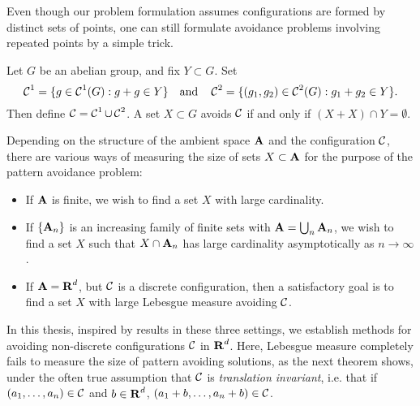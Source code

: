 
Even though our problem formulation assumes configurations are formed by distinct sets of points, one can still formulate avoidance problems involving repeated points by a simple trick.

\begin{example}
	Let $G$ be an abelian group, and fix $Y \subset G$. Set
	\[ \operatorname{\mathcal{C}}^1 = \{ g \in \operatorname{\mathcal{C}}^1(G): g + g \in Y \} \quad \text{and} \quad \operatorname{\mathcal{C}}^2 = \{ (g_1,g_2) \in \operatorname{\mathcal{C}}^2(G): g_1 + g_2 \in Y \}. \]
	Then define $\operatorname{\mathcal{C}} = \operatorname{\mathcal{C}}^1 \cup \operatorname{\mathcal{C}}^2$. A set $X \subset G$ avoids $\operatorname{\mathcal{C}}$ if and only if $(X + X) \cap Y = \emptyset$.
\end{example}

Depending on the structure of the ambient space $\operatorname{\mathbf{A}}$ and the configuration $\operatorname{\mathcal{C}}$, there are various ways of measuring the size of sets $X \subset \operatorname{\mathbf{A}}$ for the purpose of the pattern avoidance problem:
%
\begin{itemize}
	\item If $\operatorname{\mathbf{A}}$ is finite, we wish to find a set $X$ with large cardinality.
	\item If $\{ \operatorname{\mathbf{A}}_n \}$ is an increasing family of finite sets with $\operatorname{\mathbf{A}} = \bigcup_n \operatorname{\mathbf{A}}_n$, we wish to find a set $X$ such that $X \cap \operatorname{\mathbf{A}}_n$ has large cardinality asymptotically as $n \to \infty$.
	\item If $\operatorname{\mathbf{A}} = \operatorname{\mathbf{R}}^d$, but $\operatorname{\mathcal{C}}$ is a discrete configuration, then a satisfactory goal is to find a set $X$ with large Lebesgue measure avoiding $\operatorname{\mathcal{C}}$.
\end{itemize}
%
In this thesis, inspired by results in these three settings, we establish methods for avoiding non-discrete configurations $\operatorname{\mathcal{C}}$ in $\operatorname{\mathbf{R}}^d$. Here, Lebesgue measure completely fails to measure the size of pattern avoiding solutions, as the next theorem shows, under the often true assumption that $\operatorname{\mathcal{C}}$ is \emph{translation invariant}, i.e. that if $(a_1, \dots, a_n) \in \operatorname{\mathcal{C}}$ and $b \in \operatorname{\mathbf{R}}^d$, $(a_1 + b, \dots, a_n + b) \in \operatorname{\mathcal{C}}$.

